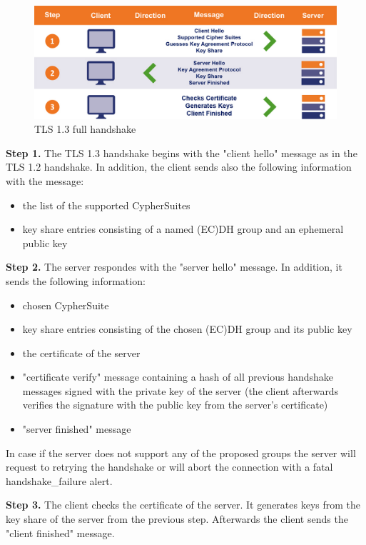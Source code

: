 \begin{figure}[H]
	\centering
		\includegraphics[scale=0.35]{images/handshake1_3.jpg}
	\caption{TLS 1.3 full handshake \cite{sslstore:handshake}}
	\label{fig:handshake1_3}
\end{figure}

\textbf{Step 1.} The TLS 1.3 handshake begins with the "client hello" message as in the TLS 1.2 handshake. In addition, the client sends also the following information with the message:

\begin{itemize}
	\item the list of the supported CypherSuites
	\item key share entries consisting of a named (EC)DH group and an ephemeral public key
\end{itemize}

\textbf{Step 2.} The server respondes with the "server hello" message. In addition, it sends the following information:

\begin{itemize}
	\item chosen CypherSuite
	\item key share entries consisting of the chosen (EC)DH group and its public key
	\item the certificate of the server
	\item "certificate verify" message containing a hash of all previous handshake messages signed with the private key of the server (the client afterwards verifies the signature with the public key from the server's certificate)
	\item "server finished" message
\end{itemize}

In case if the server does not support any of the proposed groups the server will request to retrying the handshake or will abort the connection with a fatal handshake\_failure alert.

\textbf{Step 3.} The client checks the certificate of the server. It generates keys from the key share of the server from the previous step. Afterwards the client sends the "client finished" message. \cite{Hassenstein}\cite{sslstore:handshake}

